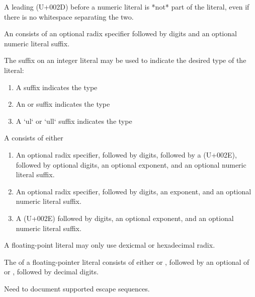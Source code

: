 \begin{Note}
A leading \Char{-} (U+002D) before a numeric literal is *not* part of the literal, even if there is no whitespace separating the two.
\end{Note}


An  consists of an optional radix specifier followed by digits and an optional numeric literal suffix.

The suffix on an integer literal may be used to indicate the desired type of the literal:

\begin{enumerate}
    \item{A  suffix indicates the  type}
    \item{An  or  suffix indicates the  type}
    \item{A `ul` or `ull` suffix indicates the  type}
\end{enumerate}


A  consists of either

\begin{enumerate}
    \item{An optional radix specifier, followed by digits, followed by a  (U+002E), followed by optional digits, an optional exponent, and an optional numeric literal suffix.}
    \item{An optional radix specifier, followed by digits, an exponent, and an optional numeric literal suffix.}
    \item{A  (U+002E) followed by digits, an optional exponent, and an optional numeric literal suffix.}
\end{enumerate}

A floating-point literal may only use dexicmal or hexadecimal radix.

The  of a floating-pointer literal consists of either  or , followed by an optional  of \Char{+} or \Char{-}, followed by decimal digits.


\begin{Incomplete}
Need to document supported escape sequences.
\end{Incomplete}

